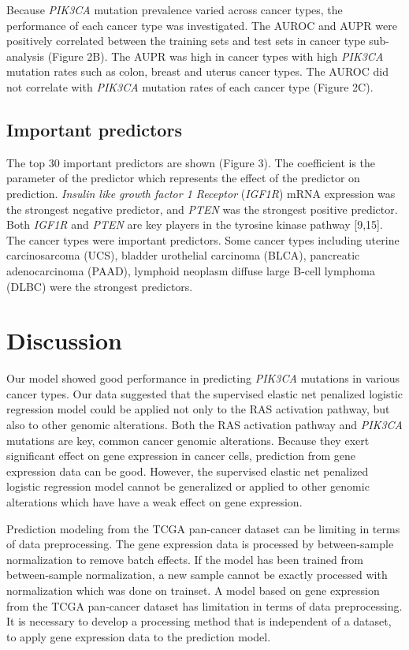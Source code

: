 \documentclass[10pt,letterpaper]{article}
\begin{document}
Because \emph{PIK3CA} mutation prevalence varied across cancer types,
the performance of each cancer type was investigated. The AUROC and AUPR
were positively correlated between the training sets and test sets in
cancer type sub-analysis (Figure 2B). The AUPR was high in cancer types
with high \emph{PIK3CA} mutation rates such as colon, breast and uterus
cancer types. The AUROC did not correlate with \emph{PIK3CA} mutation
rates of each cancer type (Figure 2C).

\hypertarget{important-predictors}{%
\subsection{Important predictors}\label{important-predictors}}

The top 30 important predictors are shown (Figure 3). The coefficient is
the parameter of the predictor which represents the effect of the
predictor on prediction. \emph{Insulin like growth factor 1 Receptor}
(\emph{IGF1R}) mRNA expression was the strongest negative predictor, and
\emph{PTEN} was the strongest positive predictor. Both \emph{IGF1R} and
\emph{PTEN} are key players in the tyrosine kinase pathway {[}9,15{]}.
The cancer types were important predictors. Some cancer types including
uterine carcinosarcoma (UCS), bladder urothelial carcinoma (BLCA),
pancreatic adenocarcinoma (PAAD), lymphoid neoplasm diffuse large B-cell
lymphoma (DLBC) were the strongest predictors.

\hypertarget{discussion}{%
\section{Discussion}\label{discussion}}

Our model showed good performance in predicting \emph{PIK3CA} mutations
in various cancer types. Our data suggested that the supervised elastic
net penalized logistic regression model could be applied not only to the
RAS activation pathway, but also to other genomic alterations. Both the
RAS activation pathway and \emph{PIK3CA} mutations are key, common
cancer genomic alterations. Because they exert significant effect on
gene expression in cancer cells, prediction from gene expression data
can be good. However, the supervised elastic net penalized logistic
regression model cannot be generalized or applied to other genomic
alterations which have have a weak effect on gene expression.

Prediction modeling from the TCGA pan-cancer dataset can be limiting in
terms of data preprocessing. The gene expression data is processed by
between-sample normalization to remove batch effects. If the model has
been trained from between-sample normalization, a new sample cannot be
exactly processed with normalization which was done on trainset. A model
based on gene expression from the TCGA pan-cancer dataset has limitation
in terms of data preprocessing. It is necessary to develop a processing
method that is independent of a dataset, to apply gene expression data
to the prediction model.
\end{document}

